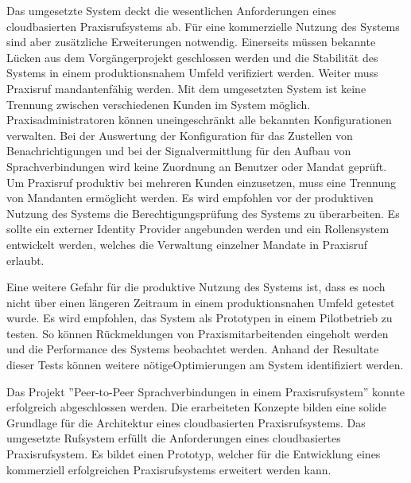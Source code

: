 Das umgesetzte System deckt die wesentlichen Anforderungen eines cloudbasierten Praxisrufsystems ab.
Für eine kommerzielle Nutzung des Systems sind aber zusätzliche Erweiterungen notwendig.
Einerseits müssen bekannte Lücken aus dem Vorgängerprojekt geschlossen werden und die Stabilität des Systems in einem produktionsnahem Umfeld verifiziert werden.
Weiter muss Praxisruf mandantenfähig werden.
Mit dem umgesetzten System ist keine Trennung zwischen verschiedenen Kunden im System möglich.
Praxisadministratoren können uneingeschränkt alle bekannten Konfigurationen verwalten.
Bei der Auswertung der Konfiguration für das Zustellen von Benachrichtigungen und bei der Signalvermittlung für den Aufbau von Sprachverbindungen wird keine Zuordnung an Benutzer oder Mandat geprüft.
Um Praxisruf produktiv bei mehreren Kunden einzusetzen, muss eine Trennung von Mandanten ermöglicht werden.
Es wird empfohlen vor der produktiven Nutzung des Systems die Berechtigungsprüfung des Systems zu überarbeiten.
Es sollte ein externer Identity Provider angebunden werden und ein Rollensystem entwickelt werden, welches die Verwaltung einzelner Mandate in Praxisruf erlaubt.

Eine weitere Gefahr für die produktive Nutzung des Systems ist, dass es noch nicht über einen längeren Zeitraum in einem produktionsnahen Umfeld getestet wurde.
Es wird empfohlen, das System als Prototypen in einem Pilotbetrieb zu testen.
So können Rückmeldungen von Praxismitarbeitenden eingeholt werden und die Performance des Systems beobachtet werden.
Anhand der Resultate dieser Tests können weitere nötigeOptimierungen am System identifiziert werden.

Das Projekt ''Peer-to-Peer Sprachverbindungen in einem Praxisrufsystem'' konnte erfolgreich abgeschlossen werden.
Die erarbeiteten Konzepte bilden eine solide Grundlage für die Architektur eines cloudbasierten Praxisrufsystems.
Das umgesetzte Rufsystem erfüllt die Anforderungen eines cloudbasiertes Praxisrufsystem.
Es bildet einen Prototyp, welcher für die Entwicklung eines kommerziell erfolgreichen Praxisrufsystems erweitert werden kann.

\clearpage
